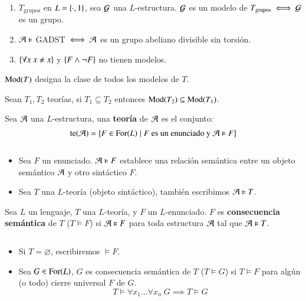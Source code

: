 \begin{eg}
    \begin{enumerate}
        \item $T_{\text{grupos}}$ en $L = \left\{\cdot, 1\right\}$, sea $\mathcal{G}$ una $L$-estructura. $\mathcal{G}$ es un modelo de $T_{\text{grupos}} \iff \mathcal{G}$ es un grupo.
        \item $\mathcal{A} \vDash$ GADST $\iff \mathcal{A}$ es un grupo abeliano divisible sin torsión.
        \item $\left\{\forall x\ x \neq x\right\}$ y $\left\{F \land \neg F\right\}$ no tienen modelos.
    \end{enumerate}
\end{eg}

\begin{obs}[Notación]
    $\mathrm{Mod}(T)$ designa la clase de todos los modelos de $T$.
\end{obs}

\begin{obs}
    Sean $T_1, T_2$ teorías, si $T_1 \subseteq T_2$ entonces $\mathrm{Mod}(T_2) \subseteq \mathrm{Mod}(T_1)$.
\end{obs}

\begin{dfn}
    Sea $\mathcal{A}$ una $L$-estructura, una \textbf{teoría} de $\mathcal{A}$ es el conjunto:
    $$
        \mathrm{te}(\mathcal{A}) = \left\{F \in \mathrm{For}(L) \mid F \text{ es un enunciado y } \mathcal{A} \vDash F\right\}
    $$
\end{dfn}

\begin{obs}$ $
    \begin{itemize}
        \item Sea $F$ un enunciado. $\mathcal{A} \vDash F$ establece una relación semántica entre un objeto semántico $\mathcal{A}$ y otro sintáctico $F$.
        \item Sea $T$ una $L$-teoría (objeto sintáctico), también escribimos $\mathcal{A} \vDash T$.
    \end{itemize}
\end{obs}

\begin{dfn}
    Sea $L$ un lenguaje, $T$ una $L$-teoría, y $F$ un $L$-enunciado. $F$ es \textbf{consecuencia semántica} de $T$ ($T \vDash F$) si $\mathcal{A} \vDash F$ para toda estructura $\mathcal{A}$ tal que $\mathcal{A} \vDash T$.
\end{dfn}

\begin{obs}$ $
    \begin{itemize}
        \item Si $T = \varnothing$, escribiremos $\vDash F$.
        \item Sea $G \in \mathrm{For}(L)$, $G$ es consecuencia semántica de $T$ ($T \vDash G$) si $T \vDash F$ para algún (o todo) cierre universal $F$ de $G$.
        $$
            T \vDash \forall x_1 \ldots \forall x_n\ G \implies T \vDash G
        $$
    \end{itemize}
\end{obs}

